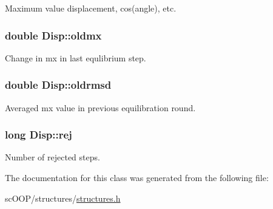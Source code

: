 Maximum value displacement, cos(angle), etc. 

\hypertarget{class_disp_a3aa81c561f1dac48d4c486468b960919}{
\subsubsection[{oldmx}]{\setlength{\rightskip}{0pt plus 5cm}double Disp\+::oldmx}}\label{class_disp_a3aa81c561f1dac48d4c486468b960919}


Change in mx in last equlibrium step. 

\hypertarget{class_disp_ad895f0ec10cdd0f00de4a65667566f5b}{
\subsubsection[{oldrmsd}]{\setlength{\rightskip}{0pt plus 5cm}double Disp\+::oldrmsd}}\label{class_disp_ad895f0ec10cdd0f00de4a65667566f5b}


Averaged mx value in previous equilibration round. 

\hypertarget{class_disp_adcb197b8efb6392c5d08e1222cd488ee}{
\subsubsection[{rej}]{\setlength{\rightskip}{0pt plus 5cm}long Disp\+::rej}}\label{class_disp_adcb197b8efb6392c5d08e1222cd488ee}


Number of rejected steps. 



The documentation for this class was generated from the following file\+:\begin{DoxyCompactItemize}
\item 
sc\+O\+O\+P/structures/\hyperlink{structures_8h}{structures.\+h}\end{DoxyCompactItemize}
